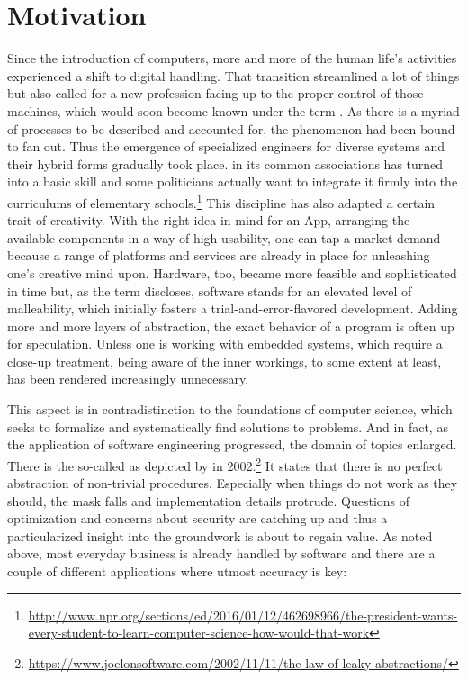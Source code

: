 \section{Motivation}
Since the introduction of computers, more and more of the human life's activities experienced a shift to digital handling. That transition streamlined a lot of things but also called for a new profession facing up to the proper control of those machines, which would soon become known under the term . As there is a myriad of processes to be described and accounted for, the phenomenon had been bound to fan out. Thus the emergence of specialized engineers for diverse systems and their hybrid forms gradually took place.  in its common associations has turned into a basic skill and some politicians actually want to integrate it firmly into the curriculums of elementary schools.\footnote{\url{http://www.npr.org/sections/ed/2016/01/12/462698966/the-president-wants-every-student-to-learn-computer-science-how-would-that-work}} This discipline has also adapted a certain trait of creativity. With the right idea in mind for an App, arranging the available components in a way of high usability, one can tap a market demand because a range of platforms and services are already in place for unleashing one's creative mind upon. Hardware, too, became more feasible and sophisticated in time but, as the term discloses, software stands for an elevated level of malleability, which initially fosters a trial-and-error-flavored development. Adding more and more layers of abstraction, the exact behavior of a program is often up for speculation. Unless one is working with embedded systems, which require a close-up treatment, being aware of the inner workings, to some extent at least, has been rendered increasingly unnecessary.


This aspect is in contradistinction to the foundations of computer science, which seeks to formalize and systematically find solutions to problems. And in fact, as the application of software engineering progressed, the domain of topics enlarged. There is the so-called  as depicted by  in 2002.\footnote{\url{https://www.joelonsoftware.com/2002/11/11/the-law-of-leaky-abstractions/}} It states that there is no perfect abstraction of non-trivial procedures. Especially when things do not work as they should, the mask falls and implementation details protrude. Questions of optimization and concerns about security are catching up and thus a particularized insight into the groundwork is about to regain value. As noted above, most everyday business is already handled by software and there are a couple of different applications where utmost accuracy is key:

